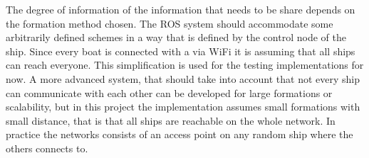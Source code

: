 The degree of information of the information that needs to be share
depends on the formation method chosen. The \ac{ROS} system should
accommodate some arbitrarily defined schemes in a way that is defined
by the control node of the ship. Since every boat is connected with a
via WiFi it is assuming that all ships can reach everyone. This
simplification is used for the testing implementations for now. A more
advanced system, that should take into account that not every ship can
communicate with each other can be developed for large formations or
scalability, but in this project the implementation assumes small
formations with small distance, that is that all ships are reachable
on the whole network. In practice the networks consists of an access
point on any random ship where the others connects to.

